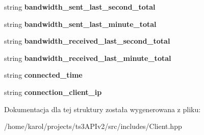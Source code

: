 \begin{DoxyCompactItemize}
\item 
string {\bfseries bandwidth\+\_\+sent\+\_\+last\+\_\+second\+\_\+total}\hypertarget{struct_ts3_api_1_1_client_1_1connection_info_afda4313a7d385cf99678ffcc20fe2426}{}\label{struct_ts3_api_1_1_client_1_1connection_info_afda4313a7d385cf99678ffcc20fe2426}

\item 
string {\bfseries bandwidth\+\_\+sent\+\_\+last\+\_\+minute\+\_\+total}\hypertarget{struct_ts3_api_1_1_client_1_1connection_info_a6269b5cc13fd231de2df4be613fe6632}{}\label{struct_ts3_api_1_1_client_1_1connection_info_a6269b5cc13fd231de2df4be613fe6632}

\item 
string {\bfseries bandwidth\+\_\+received\+\_\+last\+\_\+second\+\_\+total}\hypertarget{struct_ts3_api_1_1_client_1_1connection_info_a6d4a4fba176a5934105f604afa6c9c57}{}\label{struct_ts3_api_1_1_client_1_1connection_info_a6d4a4fba176a5934105f604afa6c9c57}

\item 
string {\bfseries bandwidth\+\_\+received\+\_\+last\+\_\+minute\+\_\+total}\hypertarget{struct_ts3_api_1_1_client_1_1connection_info_a3447203e856648cd195d1cc4466cccc1}{}\label{struct_ts3_api_1_1_client_1_1connection_info_a3447203e856648cd195d1cc4466cccc1}

\item 
string {\bfseries connected\+\_\+time}\hypertarget{struct_ts3_api_1_1_client_1_1connection_info_a898099df806c6f2ac4843b1f8cc2a6a1}{}\label{struct_ts3_api_1_1_client_1_1connection_info_a898099df806c6f2ac4843b1f8cc2a6a1}

\item 
string {\bfseries connection\+\_\+client\+\_\+ip}\hypertarget{struct_ts3_api_1_1_client_1_1connection_info_a2b0506154b5a4d7a1c3e4f3dce87b52c}{}\label{struct_ts3_api_1_1_client_1_1connection_info_a2b0506154b5a4d7a1c3e4f3dce87b52c}

\end{DoxyCompactItemize}


Dokumentacja dla tej struktury została wygenerowana z pliku\+:\begin{DoxyCompactItemize}
\item 
/home/karol/projects/ts3\+A\+P\+Iv2/src/includes/Client.\+hpp\end{DoxyCompactItemize}
